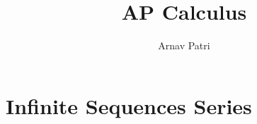 \documentclass[12pt, A4]{report}
\author{Arnav Patri}
\title{AP Calculus}
\begin{document}
	\maketitle
		\tableofcontents
			\setcounter{part}{9}
			\part{Infinite Sequences Series}
				
\end{document}
